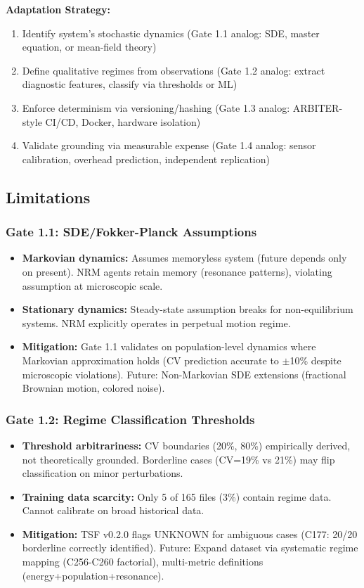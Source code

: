 \documentclass[11pt]{article}
\begin{document}
\textbf{Adaptation Strategy:}
\begin{enumerate}
\item Identify system's stochastic dynamics (Gate 1.1 analog: SDE, master equation, or mean-field theory)
\item Define qualitative regimes from observations (Gate 1.2 analog: extract diagnostic features, classify via thresholds or ML)
\item Enforce determinism via versioning/hashing (Gate 1.3 analog: ARBITER-style CI/CD, Docker, hardware isolation)
\item Validate grounding via measurable expense (Gate 1.4 analog: sensor calibration, overhead prediction, independent replication)
\end{enumerate}

\subsection{Limitations}

\subsubsection{Gate 1.1: SDE/Fokker-Planck Assumptions}

\begin{itemize}
\item \textbf{Markovian dynamics:} Assumes memoryless system (future depends only on present). NRM agents retain memory (resonance patterns), violating assumption at microscopic scale.
\item \textbf{Stationary dynamics:} Steady-state assumption breaks for non-equilibrium systems. NRM explicitly operates in perpetual motion regime.
\item \textbf{Mitigation:} Gate 1.1 validates on population-level dynamics where Markovian approximation holds (CV prediction accurate to $\pm$10\% despite microscopic violations). Future: Non-Markovian SDE extensions (fractional Brownian motion, colored noise).
\end{itemize}

\subsubsection{Gate 1.2: Regime Classification Thresholds}

\begin{itemize}
\item \textbf{Threshold arbitrariness:} CV boundaries (20\%, 80\%) empirically derived, not theoretically grounded. Borderline cases (CV=19\% vs 21\%) may flip classification on minor perturbations.
\item \textbf{Training data scarcity:} Only 5 of 165 files (3\%) contain regime data. Cannot calibrate on broad historical data.
\item \textbf{Mitigation:} TSF v0.2.0 flags UNKNOWN for ambiguous cases (C177: 20/20 borderline correctly identified). Future: Expand dataset via systematic regime mapping (C256-C260 factorial), multi-metric definitions (energy+population+resonance).
\end{itemize}
\end{document}

